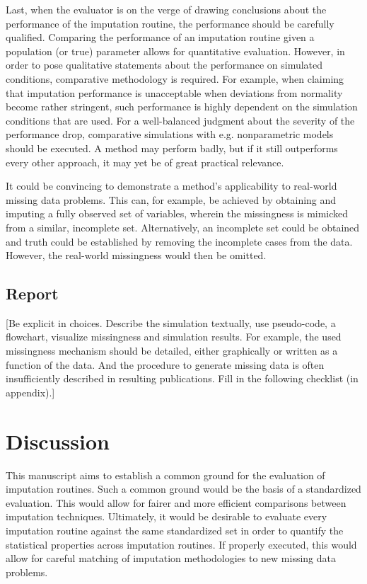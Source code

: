 \documentclass[bimj,fleqn]{w-art}
\begin{document}
Last, when the evaluator is on the verge of drawing conclusions about the performance of the imputation routine, the performance should be carefully qualified. Comparing the performance of an imputation routine given a population (or true) parameter allows for quantitative evaluation. However, in order to pose qualitative statements about the performance on simulated conditions, comparative methodology is required. For example, when claiming that imputation performance is unacceptable when deviations from normality become rather stringent, such performance is highly dependent on the simulation conditions that are used. For a well-balanced judgment about the severity of the performance drop, comparative simulations with e.g. nonparametric models should be executed. A method may perform badly, but if it still outperforms every other approach, it may yet be of great practical relevance.

It could be convincing to demonstrate a method's applicability to real-world missing data problems. This can, for example, be achieved by obtaining and imputing a fully observed set of variables, wherein the missingness is mimicked from a similar, incomplete set. Alternatively, an incomplete set could be obtained and truth could be established by removing the incomplete cases from the data. However, the real-world missingness would then be omitted.



\subsection{Report}

[Be explicit in choices. Describe the simulation textually, use pseudo-code, a flowchart, visualize missingness and simulation results. For example, the used missingness mechanism should be detailed, either graphically or written as a function of the data. And the procedure to generate missing data is often insufficiently described in resulting publications. Fill in the following checklist (in appendix).]



\section{Discussion}

This manuscript aims to establish a common ground for the evaluation of imputation routines. Such a common ground would be the basis of a standardized evaluation. This would allow for fairer and more efficient comparisons between imputation techniques. Ultimately, it would be desirable to evaluate every imputation routine against the same standardized set in order to quantify the statistical properties across imputation routines. If properly executed, this would allow for careful matching of imputation methodologies to new missing data problems. 
\end{document}
